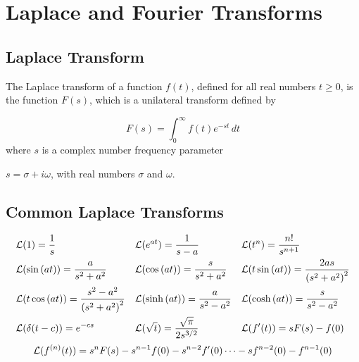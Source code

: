 \section{Laplace and Fourier Transforms}
\subsection{Laplace Transform}
\begin{defn}
The Laplace transform of a function $f(t)$, defined for all real numbers $t \geq 0$, is the function $F(s)$, which is a unilateral transform defined by

$${\displaystyle F(s)=\int _{0}^{\infty }f(t)e^{-st}\,dt}$$
where $s$ is a complex number frequency parameter

${\displaystyle s=\sigma +i\omega }$, with real numbers $\sigma$ and $\omega$.
\end{defn}

\subsection{Common Laplace Transforms}
\begin{align*}
&\mathcal{L}(1) = \frac{1}{s} & &\mathcal{L}(e^{at}) = \frac{1}{s-a} & &\mathcal{L}(t^n) = \frac{n!}{s^{n+1}}\\
&\mathcal{L}(\sin{(at)}) = \frac{a}{s^2 + a^2} & &\mathcal{L}(\cos{(at)}) = \frac{s}{s^2 + a^2} & &\mathcal{L}(t\sin{(at)}) = \frac{2as}{{(s^2 + a^2)}^2}\\
&\mathcal{L}(t\cos{(at)}) = \frac{s^2 - a^2}{{(s^2 + a^2)}^2} & &\mathcal{L}(\sinh{(at)}) = \frac{a}{s^2 - a^2} & &\mathcal{L}(\cosh{(at)}) = \frac{s}{s^2 - a^2} \\
&\mathcal{L}(\delta{(t-c)}) = e^{-cs} & &\mathcal{L}(\sqrt{t}) = \frac{\sqrt{\pi}}{2s^{3/2}} & &\mathcal{L}(f'(t)) = sF(s) - f(0)\\
\end{align*}
$$\mathcal{L}(f^{(n)} (t)) = s^nF(s) - s^{n-1}f(0) - s^{n-2}f'(0)\dots - sf^{n-2}(0) - f^{n-1}(0)$$
